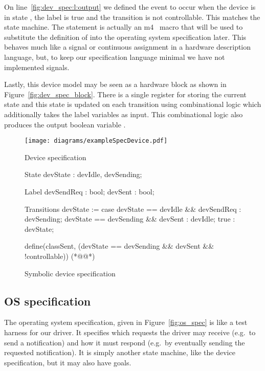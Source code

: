 On line~\ref{fig:dev_spec:l:output} we defined the  event to occur when the device is in state , the  label is true and the transition is not controllable. This matches the state machine. The  statement is actually an m4~\cite{m4} macro that will be used to substitute the definition of  into the operating system specification later. This behaves much like a signal or continuous assignment in a hardware description language, but, to keep our specification language minimal we have not implemented signals.

Lastly, this device model may be seen as a hardware block as shown in Figure~\ref{fig:dev_spec_block}. There is a single register for storing the current state and this state is updated on each transition using combinational logic which additionally takes the label variables as input. This combinational logic also produces the output boolean variable .

\begin{figure}
\centering
\texttt{[image: diagrams/exampleSpecDevice.pdf]}
\caption{Device specification}
\label{fig:dev_spec}
\end{figure}

\begin{figure}
\centering
\begin{asllisting}
State
devState : {devIdle, devSending};

Label
devSendReq : bool;
devSent    : bool;

Transitions
devState := case {
    devState == devIdle    && devSendReq : devSending;
    devState == devSending && devSent    : devIdle;
    true                                 : devState;
}

define(classSent, (devState == devSending && devSent && !controllable)) (*@\label{fig:dev_spec:l:output}@*)

\end{asllisting}
\caption{Symbolic device specification}
\label{fig:dev_spec_asl}
\end{figure}

\subsection{OS specification}

The operating system specification, given in Figure~\ref{fig:os_spec} is like a test harness for our driver. It specifies which requests the driver may receive (e.g.\ to send a notification) and how it must respond (e.g.\ by eventually sending the requested notification). It is simply another state machine, like the device specification, but it may also have goals.

